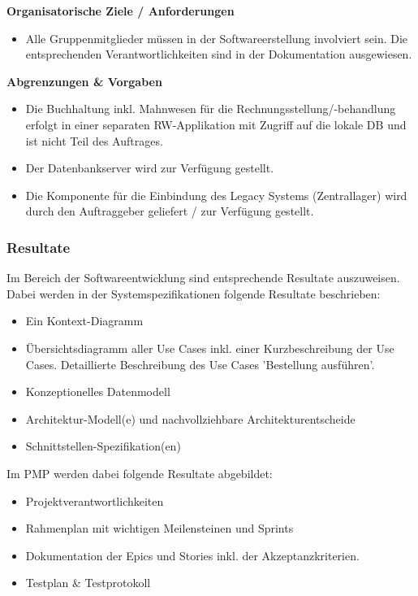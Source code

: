 \textbf{Organisatorische Ziele / Anforderungen}
\begin{itemize}
\item Alle Gruppenmitglieder müssen in der Softwareerstellung involviert sein. Die entsprechenden Verantwortlichkeiten sind in der Dokumentation ausgewiesen.
\end{itemize}

\textbf{Abgrenzungen \& Vorgaben}
\begin{itemize}
\item Die Buchhaltung inkl. Mahnwesen für die Rechnungsstellung/-behandlung erfolgt in einer separaten RW-Applikation mit Zugriff auf die lokale DB und ist nicht Teil des Auftrages.
\item Der Datenbankserver wird zur Verfügung gestellt.
\item Die Komponente für die Einbindung des Legacy Systems (Zentrallager) wird durch den Auftraggeber geliefert / zur Verfügung gestellt.
\end{itemize}

\subsubsection{Resultate}
Im Bereich der Softwareentwicklung sind entsprechende Resultate auszuweisen. Dabei werden in der Systemspezifikationen folgende Resultate beschrieben:
\begin{itemize}
\item Ein Kontext-Diagramm
\item Übersichtsdiagramm aller Use Cases inkl. einer Kurzbeschreibung der Use Cases. Detaillierte Beschreibung des Use Cases 'Bestellung ausführen'.
\item Konzeptionelles Datenmodell
\item Architektur-Modell(e) und nachvollziehbare Architekturentscheide
\item Schnittstellen-Spezifikation(en)
\end{itemize}

Im PMP werden dabei folgende Resultate abgebildet:
\begin{itemize}
\item Projektverantwortlichkeiten
\item Rahmenplan mit wichtigen Meilensteinen und Sprints
\item Dokumentation der Epics und Stories inkl. der Akzeptanzkriterien.
\item Testplan \& Testprotokoll
\end{itemize}

